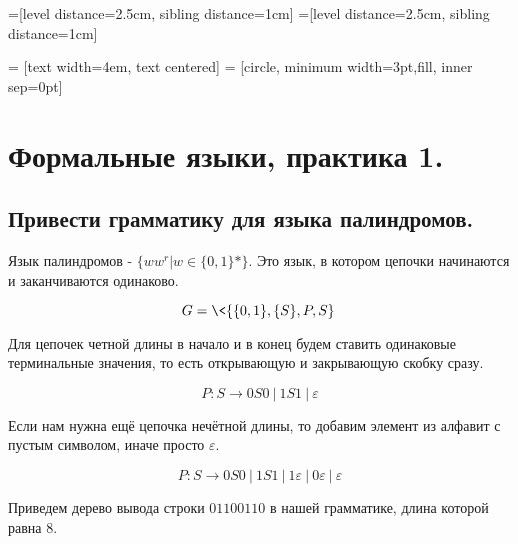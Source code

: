 \documentclass[a4paper,12pt]{article}
\date{ВШЭ ПМИ, 2022 г.}
\author{Алексей Косенко}
\theoremstyle{plain} %
\theoremstyle{definition} %
\theoremstyle{remark} %
\begin{document}
=[level distance=2.5cm, sibling distance=1cm]
=[level distance=2.5cm, sibling distance=1cm]

 = [text width=4em, text centered]
 = [circle, minimum width=3pt,fill, inner sep=0pt]

\maketitle

\section{Формальные языки, практика 1.}

\subsection{Привести грамматику для языка палиндромов.}

Язык палиндромов - $\{ w w^r | w \in \{0, 1\}* \}$. Это язык, в котором цепочки начинаются и заканчиваются одинаково. 

$$G = \<\{\{0, 1\}, \{S\}, P, S\}\>$$

Для цепочек четной длины в начало и в конец будем ставить одинаковые терминальные значения, то есть открывающую и закрывающую скобку сразу. 

$$P: S \rightarrow 0S0 \ | \ 1S1 \ | \ \varepsilon$$

Если нам нужна ещё цепочка нечётной длины, то добавим элемент из алфавит с пустым символом, иначе просто $\varepsilon$.

$$P: S \rightarrow 0S0 \ | \ 1S1 \ | \ 1\varepsilon \ | \ 0\varepsilon \ | \ \varepsilon$$


Приведем дерево вывода строки $01100110$ в нашей грамматике, длина которой равна $8$.

\end{document}
